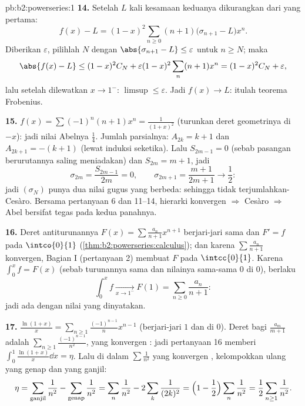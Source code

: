 \begin{solution}{pb:b2:powerseries:1}
\textbf{14.} Setelah $L$ kali kesamaan keduanya dikurangkan dari yang
pertama:
\[
f(x) - L = (1-x)^2\sum_{n\geq0}(n+1)
\bigl(\sigma_{n+1} - L\bigr)x^n .
\]
Diberikan $\varepsilon$, pilihlah $N$ dengan $\abs{\sigma_{n+1} - L}
\leq \varepsilon$ untuk $n \geq N$; maka
\[
\abs{f(x) - L} \leq (1-x)^2 C_N +
\varepsilon(1-x)^2\sum_{n}(n+1)x^n
= (1-x)^2C_N + \varepsilon ,
\]
lalu setelah dilewatkan $x \to 1^-$: $\limsup \leq \varepsilon$. Jadi
$f(x) \to L$: itulah teorema Frobenius.

\textbf{15.} $f(x) = \sum(-1)^n(n+1)x^n = \frac{1}{(1+x)^2}$
(turunkan deret geometrinya di $-x$): jadi nilai Abelnya
$\frac14$. Jumlah parsialnya: $A_{2k} = k+1$ dan $A_{2k+1} = -(k+1)$
(lewat induksi seketika). Lalu $S_{2m-1} = 0$ (sebab pasangan
berurutannya saling meniadakan) dan $S_{2m} = m + 1$, jadi
\[
\sigma_{2m} = \frac{S_{2m-1}}{2m} = 0,
\qquad
\sigma_{2m+1} = \frac{m+1}{2m+1} \to \frac12 :
\]
jadi $(\sigma_N)$ punya dua nilai gugus yang berbeda: sehingga tidak
terjumlahkan-Cesàro. Bersama pertanyaan 6 dan 11--14, hierarki
konvergen $\Rightarrow$ Cesàro $\Rightarrow$ Abel bersifat tegas
pada kedua panahnya.

\textbf{16.} Deret antiturunannya $F(x) =
\sum\frac{a_n}{n+1}x^{n+1}$ berjari-jari sama dan $F' = f$ pada
$\intco{0}{1}$ (\cref{thm:b2:powerseries:calculus}); dan karena
$\sum\frac{a_n}{n+1}$ konvergen, Bagian I (pertanyaan 2) membuat $F$
 pada $\intcc{0}{1}$. Karena $\int_0^x f = F(x)$ (sebab
turunannya sama dan nilainya sama-sama $0$ di $0$), berlaku
\[
\int_0^x f \xrightarrow[x\to1^-]{} F(1)
= \sum_{n\geq0}\frac{a_n}{n+1} :
\]
jadi  ada dengan nilai yang dinyatakan.

\textbf{17.} $\frac{\ln(1+x)}{x} =
\sum_{n\geq1}\frac{(-1)^{n-1}}{n}x^{n-1}$ (berjari-jari $1$ dan
 di $0$). Deret bagi $\frac{a_m}{m+1}$ adalah
$\sum_{n\geq1}\frac{(-1)^{n-1}}{n^2}$, yang konvergen : jadi
pertanyaan 16 memberi $\int_0^1\frac{\ln(1+x)}{x}\dd x = \eta$. Lalu di
dalam $\sum\frac1{n^2}$ yang konvergen , kelompokkan ulang yang
genap dan yang ganjil:
\[
\eta = \sum_{\text{ganjil}}\frac1{n^2} -
\sum_{\text{genap}}\frac1{n^2}
= \sum_{n}\frac1{n^2} - 2\sum_{k}\frac1{(2k)^2}
= \Bigl(1 - \frac12\Bigr)\sum_n\frac1{n^2}
= \frac12\sum_{n\geq1}\frac1{n^2} .
\]


\end{solution}
